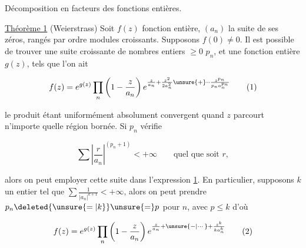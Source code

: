
Décomposition en facteurs des fonctions entières.

\uline{Théorème 1} (Weierstrass) Soit $f(z)$ fonction entière, $(a_n)$ la suite de ses zéros, rangés par ordre  modules croissants. Supposons $f(0)\ne0$. Il est possible de trouver une suite croissante de nombres entiers $\geq0$ $p_n$, et une fonction entière $g(z)$, tels que l'on ait

\[
 f(z)=e^{g(z)}\prod_n\left(1-\frac{z}{a_n}\right)e^{\frac{z}{a_n}+\frac{z^2}{2a_n^2}\unsure{+}\mathord{\cdot}\mathord{\cdot}\frac{z^{p_n}}{p_n a_n^{p_n}}} \tag*{(1)}
\]

le produit étant uniformément absolument convergent quand $z$ parcourt n'importe quelle région bornée. Si   $p_n$ vérifie

\[
 \sum\left|\frac{r}{a_n}\right|^{(p_n+1)}<+\infty\qquad\text{quel que soit }r,
\]

alors on peut employer cette suite dans l'expression \uline{1}. En particulier, supposons $k$ un entier tel que $\sum\frac{1}{|a_n|^{k+1}}<+\infty$, alors on peut prendre $p_n\deleted{\unsure{=|k}}\unsure{=}p$ pour  $n$, avec $p\leq k$ d'où

\[
 f(z)=e^{g(z)}\prod_n\left(1-\frac{z}{a_n}\right)e^{\frac{z}{a_n}+\unsure{-|\cdots}+\frac{z^k}{ka_n^k}} \tag*{(2)}
\]

